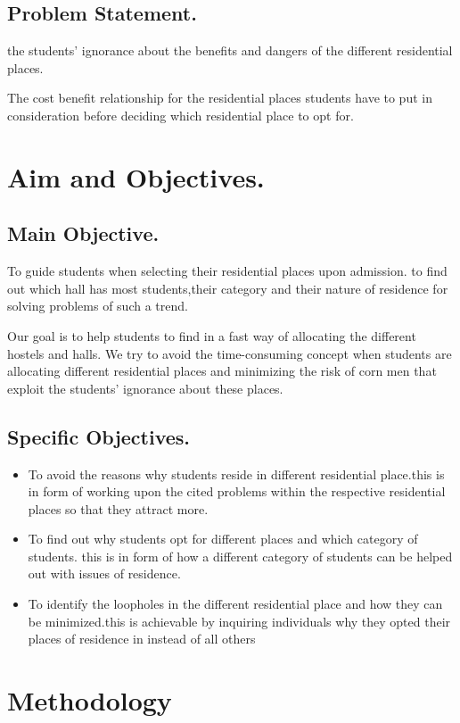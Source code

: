 \documentclass[a4paper,12pt]{article}
\begin{document}
\subsection{Problem Statement.}
the students' ignorance about the benefits and dangers of the different residential places.


The cost benefit relationship for the residential places students have to put in consideration before deciding which residential place to opt for.
\section{Aim and Objectives.}
\subsection{Main Objective.}
 To guide students when selecting their residential places upon admission.
 to find out which hall has most students,their category and their nature of residence for solving problems of such a trend.
 
 Our goal is to help students to find in a fast way of allocating the different hostels and halls.
\newline We try to avoid the time-consuming concept when students are allocating different residential places and minimizing the risk of corn men that exploit the students' ignorance about these places.
\subsection{Specific Objectives.}
\begin{itemize}
\item To avoid the reasons why students reside in different residential place.this is in form of working upon the cited problems within the respective residential places so that they attract more.
\item To find out why students opt for different places and which category of students. this is in form of how a different category of students can be helped out with issues of residence. 
\item To identify the loopholes in the different residential place and how they can be minimized.this is achievable by inquiring individuals why they opted their places of residence in instead of all others
\end{itemize}
\section{Methodology}	
\end{document}
